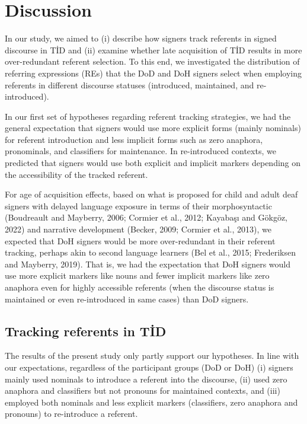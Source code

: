 \documentclass[]{elsarticle} %
\begin{document}
\hypertarget{discussion}{%
\section{Discussion}\label{discussion}}

In our study, we aimed to (i) describe how signers track referents in
signed discourse in TİD and (ii) examine whether late acquisition of TİD
results in more over-redundant referent selection. To this end, we
investigated the distribution of referring expressions (REs) that the
DoD and DoH signers select when employing referents in different
discourse statuses (introduced, maintained, and re-introduced).

In our first set of hypotheses regarding referent tracking strategies,
we had the general expectation that signers would use more explicit
forms (mainly nominals) for referent introduction and less implicit
forms such as zero anaphora, pronominals, and classifiers for
maintenance. In re-introduced contexts, we predicted that signers would
use both explicit and implicit markers depending on the accessibility of
the tracked referent.

For age of acquisition effects, based on what is proposed for child and
adult deaf signers with delayed language exposure in terms of their
morphosyntactic (Boudreault and Mayberry, 2006; Cormier et al., 2012;
Kayabaşı and Gökgöz, 2022) and narrative development (Becker, 2009;
Cormier et al., 2013), we expected that DoH signers would be more
over-redundant in their referent tracking, perhaps akin to second
language learners (Bel et al., 2015; Frederiksen and Mayberry, 2019).
That is, we had the expectation that DoH signers would use more explicit
markers like nouns and fewer implicit markers like zero anaphora even
for highly accessible referents (when the discourse status is maintained
or even re-introduced in same cases) than DoD signers.

\hypertarget{tracking-referents-in-tid}{%
\subsection{Tracking referents in TİD}\label{tracking-referents-in-tid}}

The results of the present study only partly support our hypotheses. In
line with our expectations, regardless of the participant groups (DoD or
DoH) (i) signers mainly used nominals to introduce a referent into the
discourse, (ii) used zero anaphora and classifiers but not pronouns for
maintained contexts, and (iii) employed both nominals and less explicit
markers (classifiers, zero anaphora and pronouns) to re-introduce a
referent.
\end{document}
